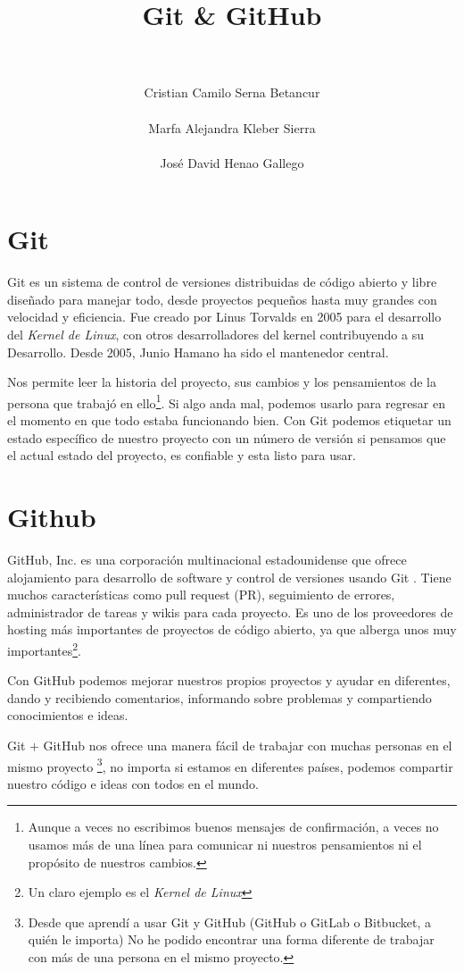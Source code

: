 \documentclass[a4paper,11pt]{article}
\title{\LARGE \bf
    Git \& GitHub
}
\author{\\\\ Cristian Camilo Serna Betancur  \\\\
Marfa Alejandra Kleber Sierra \\\\ José David Henao Gallego}
\begin{document}
\maketitle
\tableofcontents

\section{Git}
Git es un sistema de control de versiones distribuidas de código abierto y 
libre diseñado para manejar todo, desde proyectos pequeños hasta muy grandes 
con velocidad y eficiencia\cite{GIT:1}. Fue creado por Linus Torvalds en 2005 
para el desarrollo del \emph{Kernel de Linux}, con otros desarrolladores del
kernel contribuyendo a su  Desarrollo. Desde 2005, Junio Hamano ha sido el 
mantenedor central\cite{GIT:2}.

Nos permite leer la historia del proyecto, sus cambios y los pensamientos de la
persona que trabajó en ello\footnote{Aunque a veces no escribimos buenos 
mensajes de confirmación, a veces no usamos más de una línea para comunicar ni 
nuestros pensamientos ni el propósito de nuestros cambios.}. Si algo anda mal, 
podemos usarlo para regresar en el momento en que todo estaba funcionando bien. 
Con Git podemos etiquetar un estado específico de nuestro proyecto con un 
número de versión si pensamos que el actual estado del proyecto, es confiable y 
esta listo para usar.

\section{Github}
GitHub, Inc. es una corporación multinacional estadounidense que ofrece 
alojamiento para desarrollo de software y control de versiones usando Git
\cite{GITHUB:1}. Tiene muchos características como pull request (PR), 
seguimiento de errores, administrador de tareas y wikis para cada proyecto. Es 
uno de los proveedores de hosting más importantes de proyectos de código 
abierto, ya que alberga unos muy importantes\footnote{Un claro ejemplo es el
\emph{Kernel de Linux}}.

Con GitHub podemos mejorar nuestros propios proyectos y ayudar en diferentes, 
dando y recibiendo comentarios, informando sobre problemas y compartiendo 
conocimientos e ideas. 

Git $+$ GitHub nos ofrece una manera fácil de trabajar con muchas personas en 
el mismo proyecto \footnote{Desde que aprendí a usar Git y GitHub (GitHub o 
GitLab o Bitbucket, a quién le importa) No he podido encontrar una forma 
diferente de trabajar con más de una persona en el mismo proyecto.}, no importa 
si estamos en diferentes países, podemos compartir nuestro código e ideas con 
todos en el mundo. 

{}

\end{document}
